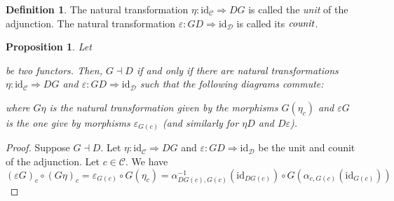 \documentclass{article}
\newcommand{\id}{\mathrm{id}}
\newcommand{\cat}{\mathcal{C}}
\newcommand{\catt}{\mathcal{D}}
\renewcommand{\epsilon}{\varepsilon}
\theoremstyle{plain}
\newtheorem{proposition}[theorem]{Proposition}
\theoremstyle{definition}
\newtheorem{definition}[theorem]{Definition}
\theoremstyle{remark}
\begin{document}
\begin{definition}
    The natural transformation $\eta : \id_\cat \Rightarrow DG$ is called the \emph{unit} of the adjunction. The natural transformation $\epsilon : GD \Rightarrow \id_\catt$ is called its $\emph{counit}$.
\end{definition}

\begin{proposition}
    Let  be two functors. Then, $G \dashv D$ if and only if there are natural transformations $\eta : \id_\cat \Rightarrow DG$ and $\epsilon : GD \Rightarrow \id_\catt$ such that the following diagrams commute:
    \begin{center}
    \end{center}
    where $G\eta$ is the natural transformation given by the morphisms $G(\eta_c)$ and $\epsilon G$ is the one give by morphisms $\epsilon_{G(c)}$ (and similarly for $\eta D$ and $D\epsilon$).
\end{proposition}

\begin{proof}
    Suppose $G \dashv D$. Let $\eta : \id_\cat \Rightarrow DG$ and $\epsilon : GD \Rightarrow \id_\catt$ be the unit and counit of the adjunction. Let $c \in \cat$. We have
    \[(\epsilon G)_c \circ (G\eta)_c = \varepsilon_{G(c)} \circ G(\eta_c) = \alpha_{DG(c),G(c)}^{-1} (\id_{DG(c)}) \circ G(\alpha_{c,G(c)}(\id_{G(c)}))\]
\end{proof}
\end{document}
